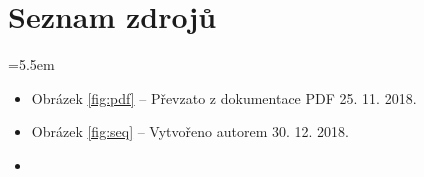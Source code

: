 \appendix

\chapter{Seznam zdrojů}

\medskip
\bgroup \leftskip=5.5em

\begin{itemize}
	
	\item Obrázek \ref{fig:pdf} -- Převzato z dokumentace PDF\cite{pdf} 25. 11. 2018.
	\item Obrázek \ref{fig:seq} -- Vytvořeno autorem 30. 12. 2018.
	\item 
	
\end{itemize}

\par\egroup